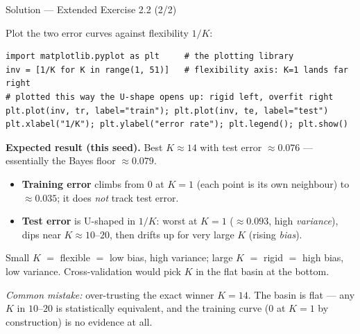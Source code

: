 \documentclass[aspectratio=169,11pt]{beamer}
\begin{document}
\begin{frame}[fragile]{Solution --- Extended Exercise 2.2 (2/2)}
\begin{solutionbox}
\scriptsize
Plot the two error curves against flexibility $1/K$:
\begin{lstlisting}
import matplotlib.pyplot as plt     # the plotting library
inv = [1/K for K in range(1, 51)]   # flexibility axis: K=1 lands far right
# plotted this way the U-shape opens up: rigid left, overfit right
plt.plot(inv, tr, label="train"); plt.plot(inv, te, label="test")
plt.xlabel("1/K"); plt.ylabel("error rate"); plt.legend(); plt.show()
\end{lstlisting}
\textbf{Expected result (this seed).} Best $K\approx14$ with test error $\approx0.076$ --- essentially the Bayes floor $\approx0.079$.
\begin{itemize}\setlength\itemsep{0pt}
  \item \textbf{Training error} climbs from $0$ at $K=1$ (each point is its own neighbour) to $\approx0.035$; it does \emph{not} track test error.
  \item \textbf{Test error} is U-shaped in $1/K$: worst at $K=1$ ($\approx0.093$, high \emph{variance}), dips near $K\approx10\text{--}20$, then drifts up for very large $K$ (rising \emph{bias}).
\end{itemize}
Small $K$ $=$ flexible $=$ low bias, high variance; large $K$ $=$ rigid $=$ high bias, low variance. Cross-validation would pick $K$ in the flat basin at the bottom.

\smallskip
\textit{Common mistake:} over-trusting the exact winner $K=14$. The basin is flat --- any $K$ in $10$--$20$ is statistically equivalent, and the training curve ($0$ at $K=1$ by construction) is no evidence at all.
\end{solutionbox}
\end{frame}
\end{document}
